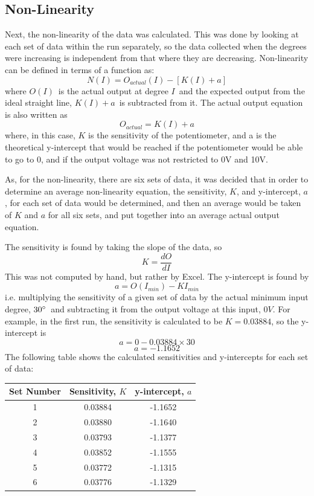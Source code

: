 \documentclass[a4,11pt]{article}
\begin{document}
\subsection{Non-Linearity}
Next, the non-linearity of the data was calculated. This was done by looking at each set of data within the run separately, so the data collected when the degrees were increasing is independent from that where they are decreasing.
Non-linearity can be defined in terms of a function as:
$$N(I)=O_{actual}(I)-[K(I)+a]$$
where $O(I)$\ is the actual output at degree $I$\ and the expected output from the ideal straight line, $K(I)+a$\ is subtracted from it. The actual output equation is also written as
$$O_{actual}=K(I)+a$$
where, in this case, $K$ is the sensitivity of the potentiometer, and a is the theoretical y-intercept that would be reached if the potentiometer would be able to go to 0\degree, and if the output voltage was not restricted to 0V and 10V.

As, for the non-linearity, there are six sets of data, it was decided that in order to determine an average non-linearity equation, the sensitivity, $K$, and y-intercept, $a$, for each set of data would be determined, and then an average would be taken of $K$ and $a$ for all six sets, and put together into an average actual output equation.

The sensitivity is found by taking the slope of the data, so
$$K=\frac{dO}{dI}$$
This was not computed by hand, but rather by Excel. The y-intercept is found by
$$a=O(I_{min})-KI_{min}$$
i.e. multiplying the sensitivity of a given set of data by the actual minimum input degree, $30\degree$\ and subtracting it from the output voltage at this input, $0V$. For example, in the first run, the sensitivity is calculated to be $K=0.03884$, so the y-intercept is
$$a=0-0.03884\times30$$
$$a=-1.1652$$
The following table shows the calculated sensitivities and y-intercepts for each set of data:
\begin{center}
	\begin{tabular}{c|c|c}
		Set Number & Sensitivity, $K$ & y-intercept, $a$ \\
		\hline
		1 & 0.03884 & -1.1652 \\
		2 & 0.03880 & -1.1640 \\
		3 & 0.03793 & -1.1377 \\
		4 & 0.03852 & -1.1555 \\
		5 & 0.03772 & -1.1315 \\
		6 & 0.03776 & -1.1329 \\
		\hline
	\end{tabular}
\end{center}
\end{document}
